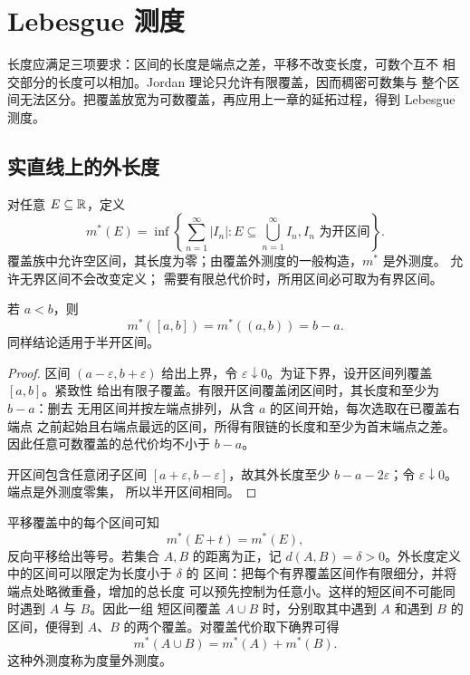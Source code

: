 \chapter{Lebesgue 测度}
\label{chap:lebesgue-measure}

长度应满足三项要求：区间的长度是端点之差，平移不改变长度，可数个互不
相交部分的长度可以相加。Jordan 理论只允许有限覆盖，因而稠密可数集与
整个区间无法区分。把覆盖放宽为可数覆盖，再应用上一章的延拓过程，得到
Lebesgue 测度。

\section{实直线上的外长度}

对任意 $E\subseteq\mathbb{R}$，定义
\begin{equation}
 m^*(E)=\inf\left\{\sum_{n=1}^{\infty}|I_n|:
 E\subseteq\bigcup_{n=1}^{\infty}I_n, I_n\text{ 为开区间}\right\}.
 \label{eq:lebesgue-outer-measure-line}
\end{equation}
覆盖族中允许空区间，其长度为零；由覆盖外测度的一般构造，$m^*$ 是外测度。
允许无界区间不会改变定义；
需要有限总代价时，所用区间必可取为有界区间。

\begin{lemma}[区间的外长度]
\label{lem:interval-outer-length}
若 $a<b$，则
\[
 m^*([a,b])=m^*((a,b))=b-a.
\]
同样结论适用于半开区间。
\end{lemma}

\begin{proof}
区间 $(a-\varepsilon,b+\varepsilon)$ 给出上界，令
$\varepsilon\downarrow0$。为证下界，设开区间列覆盖 $[a,b]$。紧致性
给出有限子覆盖。有限开区间覆盖闭区间时，其长度和至少为 $b-a$：删去
无用区间并按左端点排列，从含 $a$ 的区间开始，每次选取在已覆盖右端点
之前起始且右端点最远的区间，所得有限链的长度和至少为首末端点之差。
因此任意可数覆盖的总代价均不小于 $b-a$。

开区间包含任意闭子区间 $[a+\varepsilon,b-\varepsilon]$，故其外长度至少
$b-a-2\varepsilon$；令 $\varepsilon\downarrow0$。端点是外测度零集，
所以半开区间相同。
\end{proof}

平移覆盖中的每个区间可知
\begin{equation}
 m^*(E+t)=m^*(E),
 \label{eq:outer-measure-translation}
\end{equation}
反向平移给出等号。若集合 $A,B$ 的距离为正，记
$d(A,B)=\delta>0$。外长度定义中的区间可以限定为长度小于 $\delta$ 的
区间：把每个有界覆盖区间作有限细分，并将端点处略微重叠，增加的总长度
可以预先控制为任意小。这样的短区间不可能同时遇到 $A$ 与 $B$。因此一组
短区间覆盖 $A\cup B$ 时，分别取其中遇到 $A$ 和遇到 $B$ 的区间，便得到
$A$、$B$ 的两个覆盖。对覆盖代价取下确界可得
\begin{equation}
 m^*(A\cup B)=m^*(A)+m^*(B).
 \label{eq:metric-outer-additivity}
\end{equation}
这种外测度称为度量外测度。

